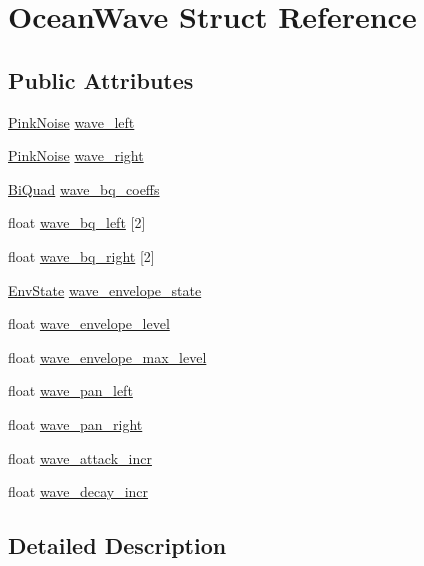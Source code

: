 \hypertarget{struct_ocean_wave}{}\section{Ocean\+Wave Struct Reference}
\label{struct_ocean_wave}
\subsection*{Public Attributes}
\begin{DoxyCompactItemize}
\item 
\hyperlink{struct_pink_noise}{Pink\+Noise} \hyperlink{struct_ocean_wave_afa6bba35115a6e2402c375ee02af3521}{wave\+\_\+left}
\item 
\hyperlink{struct_pink_noise}{Pink\+Noise} \hyperlink{struct_ocean_wave_a9a4be6c3658f3b1d621be571347c23d4}{wave\+\_\+right}
\item 
\hyperlink{struct_bi_quad}{Bi\+Quad} \hyperlink{struct_ocean_wave_a71beacaa3874895b2a12b859c75ef221}{wave\+\_\+bq\+\_\+coeffs}
\item 
float \hyperlink{struct_ocean_wave_a3c8eb3bb9054a58dc559e3e14388d3b6}{wave\+\_\+bq\+\_\+left} \mbox{[}2\mbox{]}
\item 
float \hyperlink{struct_ocean_wave_a9b11563586b3d01e068a92d27715d6de}{wave\+\_\+bq\+\_\+right} \mbox{[}2\mbox{]}
\item 
\hyperlink{paex__ocean__shore_8c_a6ef105f364067626d9f25c5589aaff2e}{Env\+State} \hyperlink{struct_ocean_wave_a9d013e0e64432874f4f24530cfbc247e}{wave\+\_\+envelope\+\_\+state}
\item 
float \hyperlink{struct_ocean_wave_a53bf7a8e1f27f3bc9c1a099a1faf1334}{wave\+\_\+envelope\+\_\+level}
\item 
float \hyperlink{struct_ocean_wave_a461d0f27c5564cabc2ae5e4f756c3dbb}{wave\+\_\+envelope\+\_\+max\+\_\+level}
\item 
float \hyperlink{struct_ocean_wave_aa7b309b1765c05b912f425a46e6729d2}{wave\+\_\+pan\+\_\+left}
\item 
float \hyperlink{struct_ocean_wave_adc20e359cb3a5ba648c756ae143610f2}{wave\+\_\+pan\+\_\+right}
\item 
float \hyperlink{struct_ocean_wave_a0fc8fc2189599f8f5bf214d1a0a09e44}{wave\+\_\+attack\+\_\+incr}
\item 
float \hyperlink{struct_ocean_wave_ada6ae9c11ee04ba30ca61fc22ba0362f}{wave\+\_\+decay\+\_\+incr}
\end{DoxyCompactItemize}


\subsection{Detailed Description}


